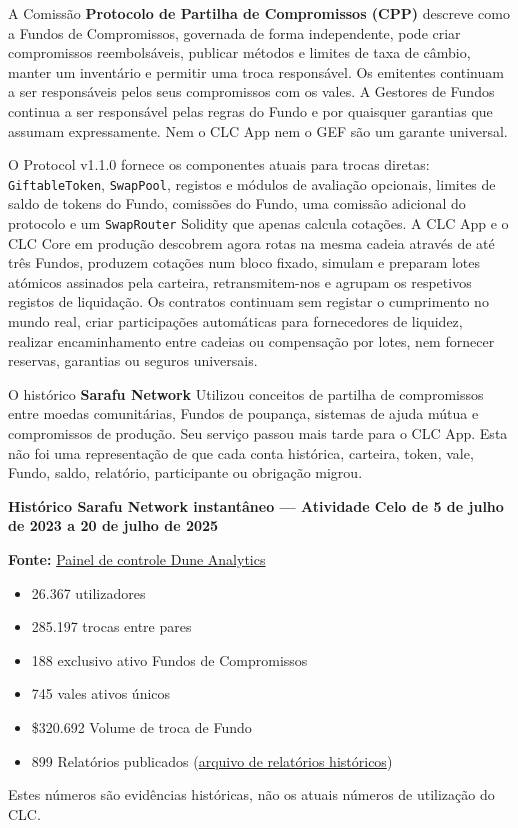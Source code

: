 \documentclass[11pt]{article}
\begin{document}
A Comissão \textbf{Protocolo de Partilha de Compromissos (CPP)} descreve como a Fundos de Compromissos, governada de forma independente, pode criar compromissos reembolsáveis, publicar métodos e limites de taxa de câmbio, manter um inventário e permitir uma troca responsável. Os emitentes continuam a ser responsáveis pelos seus compromissos com os vales. A Gestores de Fundos continua a ser responsável pelas regras do Fundo e por quaisquer garantias que assumam expressamente. Nem o CLC App nem o GEF são um garante universal.

O Protocol v1.1.0 fornece os componentes atuais para trocas diretas: \texttt{GiftableToken}, \texttt{SwapPool}, registos e módulos de avaliação opcionais, limites de saldo de tokens do Fundo, comissões do Fundo, uma comissão adicional do protocolo e um \texttt{SwapRouter} Solidity que apenas calcula cotações. A CLC App e o CLC Core em produção descobrem agora rotas na mesma cadeia através de até três Fundos, produzem cotações num bloco fixado, simulam e preparam lotes atómicos assinados pela carteira, retransmitem-nos e agrupam os respetivos registos de liquidação. Os contratos continuam sem registar o cumprimento no mundo real, criar participações automáticas para fornecedores de liquidez, realizar encaminhamento entre cadeias ou compensação por lotes, nem fornecer reservas, garantias ou seguros universais.

O histórico \textbf{Sarafu Network} Utilizou conceitos de partilha de compromissos entre moedas comunitárias, Fundos de poupança, sistemas de ajuda mútua e compromissos de produção. Seu serviço passou mais tarde para o CLC App. Esta não foi uma representação de que cada conta histórica, carteira, token, vale, Fundo, saldo, relatório, participante ou obrigação migrou.

\textbf{Histórico Sarafu Network instantâneo --- Atividade Celo de 5 de julho de 2023 a 20 de julho de 2025}

\textbf{Fonte:} \href{https://dune.com/grassrootseconomics/sarafu-network}{Painel de controle Dune Analytics}

\begin{itemize}[leftmargin=*]
\item 26.367 utilizadores
\item 285.197 trocas entre pares
\item 188 exclusivo ativo Fundos de Compromissos
\item 745 vales ativos únicos
\item \$320.692 Volume de troca de Fundo
\item 899 Relatórios publicados (\href{https://sarafu.network/reports}{arquivo de relatórios históricos})
\end{itemize}
Estes números são evidências históricas, não os atuais números de utilização do CLC.
\end{document}
